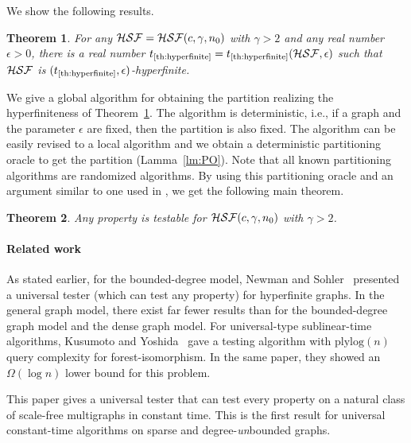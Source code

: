 \documentclass[11pt]{article}
\newtheorem{thm}{Theorem}[section]
\begin{document}
We show the following results. 


\begin{thm}\label{th:hyperfinite}
For any 
${\cal HSF} = {\cal HSF}(c,\gamma,n_0)$ 
with $\gamma >2$ 
and any real number $\epsilon >0$, 
there is a real number $t_{\mbox{\scriptsize \ref{th:hyperfinite}}}
=t_{\mbox{\scriptsize \ref{th:hyperfinite}}} ({\cal HSF} ,\epsilon)$ 
such that 
${\cal HSF}$ is 
$(t_{\mbox{\scriptsize \ref{th:hyperfinite}}}, \epsilon)$-hyperfinite. 
\end{thm}


We give a global algorithm for obtaining the partition realizing the hyperfiniteness of Theorem~\ref{th:hyperfinite}.  
The algorithm is deterministic, i.e., 
if a graph and the parameter $\epsilon$ are fixed, 
then the partition is also fixed. 
The algorithm can be easily revised to a local algorithm and we obtain a deterministic partitioning oracle to get the partition (Lamma~\ref{lm:PO}).  
Note that all known partitioning algorithms
are randomized algorithms.  
By using this partitioning oracle and an argument similar to one used in \cite{NS_Testable_SJCOMP13}, we get the following main theorem. 


\begin{thm}\label{th:testable}
Any property is testable 
for ${\cal HSF}(c,\gamma,n_0)$ 
with $\gamma >2$. 
\end{thm}



\paragraph{Related work}
As stated earlier, for the bounded-degree model, Newman and Sohler~\cite{NS_Testable_SJCOMP13} presented a universal tester (which can test any property) 
for hyperfinite graphs.  
In the general graph model, there exist far fewer results than for the bounded-degree graph model and the dense graph model. 
For universal-type sublinear-time algorithms, 
Kusumoto and Yoshida~\cite{Kusumoto-Yoshida-ICALP14} gave 
a testing algorithm with $\mbox{plylog}(n)$ query complexity for 
forest-isomorphism. In the same paper, they showed an $\Omega (\log n)$ lower bound for this problem.  

This paper gives a universal tester that can test every property on a natural class of scale-free multigraphs in constant time. 
This is the first result for universal constant-time algorithms on sparse and degree-{\em un}bounded graphs. 
\end{document}
